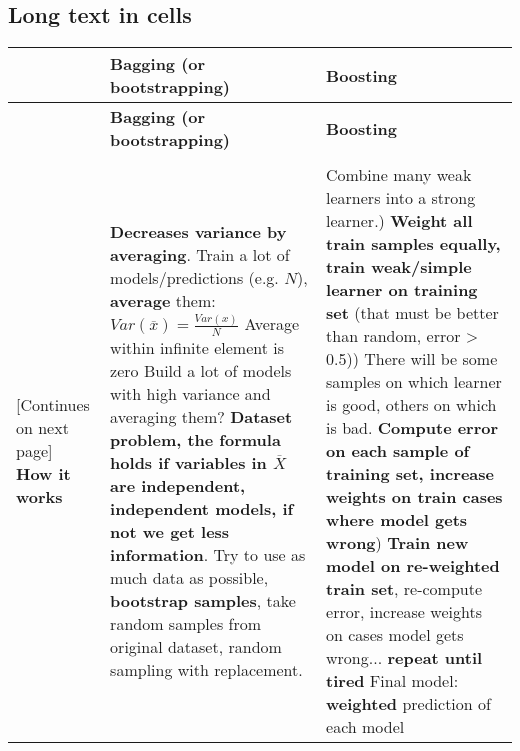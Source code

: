 \subsection{Long text in cells}
\begin{tabularx}{\linewidth}{p{}|X|X}
    \toprule
    \textbf{} & \textbf{Bagging (or bootstrapping)} & \textbf{Boosting}\\
    \midrule
    \endfirsthead
    \toprule
    \textbf{} & \textbf{Bagging (or bootstrapping)} & \textbf{Boosting}\\
    \\
    \midrule
    \endhead
    \midrule
    \footnotesize [Continues on next page]
    \endfoot
    \bottomrule
    \endlastfoot
    \textbf{How it works} & \textbf{Decreases variance by averaging}.\newline
    Train a lot of models/predictions (e.g. $N$), \textbf{average} them:
    \newline\newline $Var(\overline{x})=\frac{Var(x)}{N}$\newline\newline
    Average within infinite element is zero\newline
    Build a lot of models with high variance and averaging them? \textbf{Dataset problem, the formula holds if variables in $\overline{X}$ are independent, independent models, if not we get less information}.\newline
    Try to use as much data as possible, \textbf{bootstrap samples}, take random samples from original dataset, random sampling with replacement. & 
    Combine many weak learners into a strong learner.\newline\newline
    1) \textbf{Weight all train samples equally, train weak/simple learner on training set} (that must be better than random, error > 0.5)\newline\newline
    2) There will be some samples on which learner is good, others on which is bad. \textbf{Compute error on each sample of training set, increase weights on train cases where model gets wrong}\newline\newline
    3) \textbf{Train new model on re-weighted train set}, re-compute error, increase weights on cases model gets wrong... \textbf{repeat until tired}\newline\newline
    Final model: \textbf{weighted} prediction of each model
\end{tabularx}

